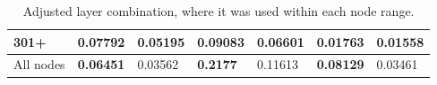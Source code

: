 \begin{table*}[h!]
\begin{tabular}{|l|l|l||l|l||l|l|}
        301+      & \textbf{0.07792}                        & 0.05195                        & \textbf{0.09083}                 & 0.06601          & \textbf{0.01763} & 0.01558          \\ \hline
        All nodes & \textbf{0.06451}                        & 0.03562                        & \textbf{0.2177 }                 & 0.11613          & \textbf{0.08129} & 0.03461          \\ \hline
    \end{tabular}
    \caption{Adjusted layer combination, where it was used within each node range.}
    \label{tab:recall-adjusted-layer-bad-performance}
\end{table*}

